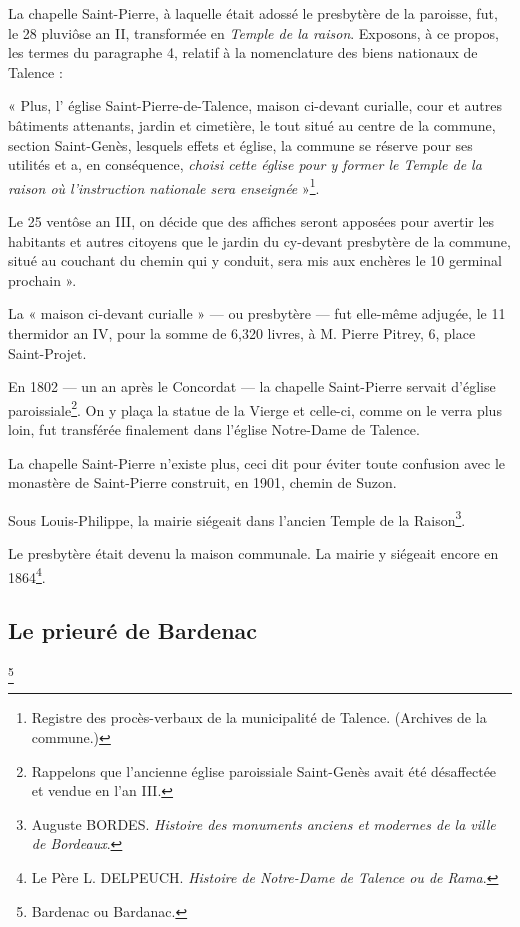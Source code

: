 La chapelle Saint-Pierre, à laquelle était adossé le presbytère de la paroisse, fut, le 28 pluviôse an II, transformée en \textit{Temple de la raison}. Exposons, à ce propos, les termes du paragraphe 4, relatif à la nomenclature des biens nationaux de Talence :

« Plus, l' église Saint-Pierre-de-Talence, maison ci-devant curialle, cour et autres bâtiments attenants, jardin et cimetière, le tout situé au centre de la commune, section Saint-Genès, lesquels effets et église, la commune se réserve pour ses utilités et a, en conséquence, \textit{choisi cette église pour y former le Temple de la raison où l'instruction nationale sera enseignée} »\footnote{Registre des procès-verbaux de la municipalité de Talence. (Archives de la commune.)}.

Le 25 ventôse an III, on décide que des affiches seront apposées pour avertir les habitants et autres citoyens que le jardin du cy-devant presbytère de la commune, situé au couchant du chemin qui y conduit, sera mis aux enchères le 10 germinal prochain ».

La « maison ci-devant curialle » — ou presbytère — fut elle-même adjugée, le 11 thermidor an IV, pour la somme de 6,320 livres, à M. Pierre Pitrey, 6, place Saint-Projet.

En 1802 — un an après le Concordat — la chapelle Saint-Pierre servait d'église paroissiale\footnote{Rappelons que l'ancienne église paroissiale Saint-Genès avait été désaffectée et vendue en l'an III.}. On y plaça la statue de la Vierge et celle-ci, comme on le verra plus loin, fut transférée finalement dans l'église Notre-Dame de Talence.

La chapelle Saint-Pierre n'existe plus, ceci dit pour éviter toute confusion avec le monastère de Saint-Pierre construit, en 1901, chemin de Suzon.

Sous Louis-Philippe, la mairie siégeait dans l'ancien Temple de la Raison\footnote{Auguste BORDES. \textit{Histoire des monuments anciens et modernes de la ville de Bordeaux}.}.

Le presbytère était devenu la maison communale. La mairie y siégeait encore en 1864\footnote{Le Père L. DELPEUCH. \textit{Histoire de Notre-Dame de Talence ou de Rama}.}.

\subsection{Le prieuré de Bardenac}\footnote{Bardenac ou Bardanac.}

